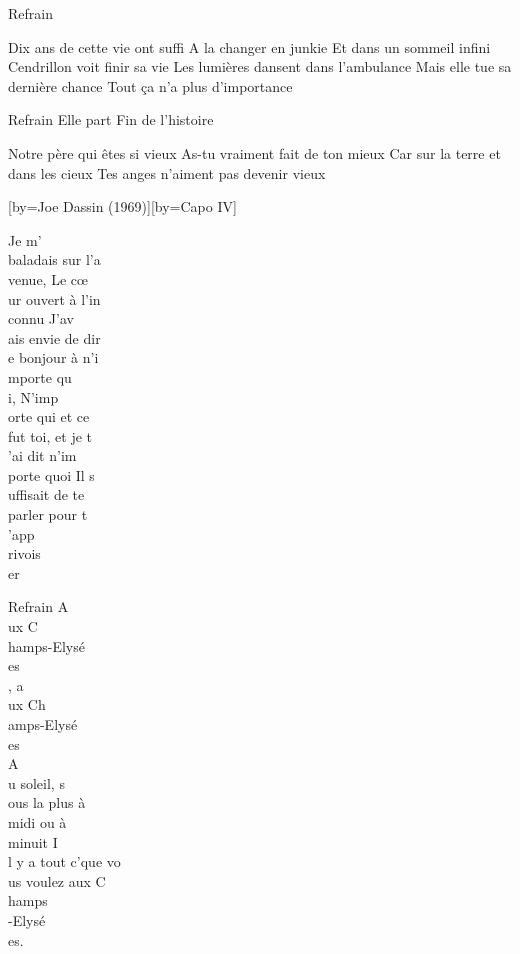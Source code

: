 \beginverse
Refrain
\endverse

\beginverse
Dix ans de cette vie ont suffi
A la changer en junkie 
Et dans un sommeil infini
Cendrillon voit finir sa vie
Les lumières dansent dans l'ambulance
Mais elle tue sa dernière chance
Tout ça n'a plus d'importance
\endverse

	Refrain
Elle part
Fin de l'histoire

\beginverse
Notre père qui êtes si vieux
As-tu vraiment fait de ton mieux
Car sur la terre et dans les cieux
Tes anges n'aiment pas devenir vieux
\endverse

[by={Joe Dassin (1969)}][by={Capo IV}]

\beginverse
Je m'\\[Do]baladais sur l'a\\[Mi7]venue, 
Le cœ\\[Lam]ur ouvert à l'in\\[Do7]connu 
J'av\\[Fa]ais envie de dir\\[Do]e bonjour à n'i\\[Ré7]mporte qu\\[Sol]i, 
N'imp\\[Do]orte qui et ce\\[Mi7] fut toi, et je t\\[Lam]'ai dit n'im\\[Do7]porte quoi
Il s\\[Fa]uffisait de te\\[Do] parler pour t\\[Ré]'app\\[Sol7]rivois\\[Do]er
\endverse

	Refrain
A\\[Do]ux C\\[Mi7]hamps-Elysé\\[Lam]es\\[Do7], a\\[Fa]ux Ch\\[Do]amps-Elysé\\[Ré7]es\\[Sol] 
A\\[Do]u soleil, s\\[Mi7]ous la plus à\\[Lam] midi ou à\\[Do7] minuit
I\\[Fa]l y a tout c’que vo\\[Do]us voulez aux C\\[Sol]hamps\\[Sol7]-Elysé\\[Do]es.

